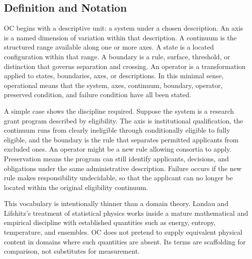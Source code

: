 \documentclass[11pt,a4paper,openany]{book}
\begin{document}
\subsection{Definition and Notation}
OC begins with a descriptive unit: a system under a chosen description. An axis is a named dimension of variation within that description. A continuum is the structured range available along one or more axes. A state is a located configuration within that range. A boundary is a rule, surface, threshold, or distinction that governs separation and crossing. An operator is a transformation applied to states, boundaries, axes, or descriptions. In this minimal sense, operational means that the system, axes, continuum, boundary, operator, preserved condition, and failure condition have all been stated. \cite{goldenfeld_lectures,kadanoff_scaling}\par
A simple case shows the discipline required. Suppose the system is a research grant program described by eligibility. The axis is institutional qualification, the continuum runs from clearly ineligible through conditionally eligible to fully eligible, and the boundary is the rule that separates permitted applicants from excluded ones. An operator might be a new rule allowing consortia to apply. Preservation means the program can still identify applicants, decisions, and obligations under the same administrative description. Failure occurs if the new rule makes responsibility undecidable, so that the applicant can no longer be located within the original eligibility continuum.\par
This vocabulary is intentionally thinner than a domain theory. Landau and Lifshitz's treatment of statistical physics works inside a mature mathematical and empirical discipline with established quantities such as energy, entropy, temperature, and ensembles. OC does not pretend to supply equivalent physical content in domains where such quantities are absent. Its terms are scaffolding for comparison, not substitutes for measurement.\par
\end{document}
